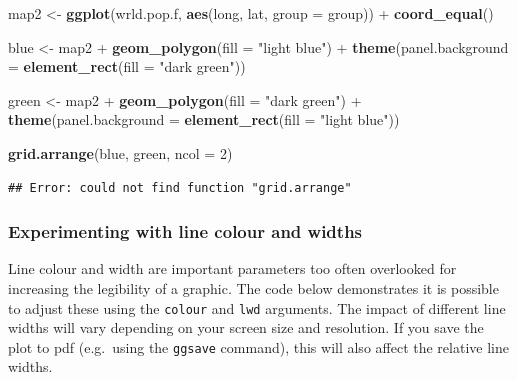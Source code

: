 \documentclass[]{article}
\newenvironment{Shaded}{}{}
\newcommand{\KeywordTok}[1]{\textcolor[rgb]{0.00,0.44,0.13}{\textbf{{#1}}}}
\newcommand{\DataTypeTok}[1]{\textcolor[rgb]{0.56,0.13,0.00}{{#1}}}
\newcommand{\DecValTok}[1]{\textcolor[rgb]{0.25,0.63,0.44}{{#1}}}
\newcommand{\StringTok}[1]{\textcolor[rgb]{0.25,0.44,0.63}{{#1}}}
\newcommand{\NormalTok}[1]{{#1}}
\begin{document}
\begin{Shaded}
\begin{Highlighting}[]
\NormalTok{map2 <-}\StringTok{ }\KeywordTok{ggplot}\NormalTok{(wrld.pop.f, }\KeywordTok{aes}\NormalTok{(long, lat, }\DataTypeTok{group =} \NormalTok{group)) +}\StringTok{ }\KeywordTok{coord_equal}\NormalTok{()}

\NormalTok{blue <-}\StringTok{ }\NormalTok{map2 +}\StringTok{ }\KeywordTok{geom_polygon}\NormalTok{(}\DataTypeTok{fill =} \StringTok{"light blue"}\NormalTok{) +}\StringTok{ }\KeywordTok{theme}\NormalTok{(}\DataTypeTok{panel.background =} \KeywordTok{element_rect}\NormalTok{(}\DataTypeTok{fill =} \StringTok{"dark green"}\NormalTok{))}

\NormalTok{green <-}\StringTok{ }\NormalTok{map2 +}\StringTok{ }\KeywordTok{geom_polygon}\NormalTok{(}\DataTypeTok{fill =} \StringTok{"dark green"}\NormalTok{) +}\StringTok{ }\KeywordTok{theme}\NormalTok{(}\DataTypeTok{panel.background =} \KeywordTok{element_rect}\NormalTok{(}\DataTypeTok{fill =} \StringTok{"light blue"}\NormalTok{))}

\KeywordTok{grid.arrange}\NormalTok{(blue, green, }\DataTypeTok{ncol =} \DecValTok{2}\NormalTok{)}
\end{Highlighting}
\end{Shaded}

\begin{verbatim}
## Error: could not find function "grid.arrange"
\end{verbatim}

\subsubsection{Experimenting with line colour and
widths}\label{experimenting-with-line-colour-and-widths}

Line colour and width are important parameters too often overlooked for
increasing the legibility of a graphic. The code below demonstrates it
is possible to adjust these using the \texttt{colour} and \texttt{lwd}
arguments. The impact of different line widths will vary depending on
your screen size and resolution. If you save the plot to pdf (e.g.~using
the \texttt{ggsave} command), this will also affect the relative line
widths.
\end{document}
